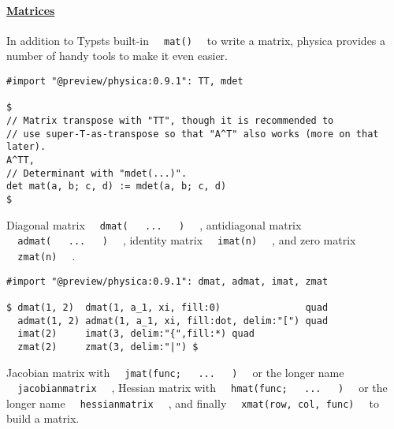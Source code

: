 \pandocbounded{}

\paragraph{\texorpdfstring{\hyperref[matrices]{Matrices}}{Matrices}}\label{matrices}

In addition to Typst\textquotesingle s built-in
\texttt{\ }{\texttt{\ mat()\ }}\texttt{\ } to write a matrix, physica
provides a number of handy tools to make it even easier.

\begin{verbatim}
#import "@preview/physica:0.9.1": TT, mdet

$
// Matrix transpose with "TT", though it is recommended to
// use super-T-as-transpose so that "A^T" also works (more on that later).
A^TT,
// Determinant with "mdet(...)".
det mat(a, b; c, d) := mdet(a, b; c, d)
$
\end{verbatim}

\pandocbounded{}

Diagonal matrix
\texttt{\ }{\texttt{\ dmat(\ }}\texttt{\ }{\texttt{\ ...\ }}\texttt{\ }{\texttt{\ )\ }}\texttt{\ }
, antidiagonal matrix
\texttt{\ }{\texttt{\ admat(\ }}\texttt{\ }{\texttt{\ ...\ }}\texttt{\ }{\texttt{\ )\ }}\texttt{\ }
, identity matrix \texttt{\ }{\texttt{\ imat(n)\ }}\texttt{\ } , and
zero matrix \texttt{\ }{\texttt{\ zmat(n)\ }}\texttt{\ } .

\begin{verbatim}
#import "@preview/physica:0.9.1": dmat, admat, imat, zmat

$ dmat(1, 2)  dmat(1, a_1, xi, fill:0)               quad
  admat(1, 2) admat(1, a_1, xi, fill:dot, delim:"[") quad
  imat(2)     imat(3, delim:"{",fill:*) quad
  zmat(2)     zmat(3, delim:"|") $
\end{verbatim}

\pandocbounded{}

Jacobian matrix with
\texttt{\ }{\texttt{\ jmat(func;\ }}\texttt{\ }{\texttt{\ ...\ }}\texttt{\ }{\texttt{\ )\ }}\texttt{\ }
or the longer name \texttt{\ }{\texttt{\ jacobianmatrix\ }}\texttt{\ } ,
Hessian matrix with
\texttt{\ }{\texttt{\ hmat(func;\ }}\texttt{\ }{\texttt{\ ...\ }}\texttt{\ }{\texttt{\ )\ }}\texttt{\ }
or the longer name \texttt{\ }{\texttt{\ hessianmatrix\ }}\texttt{\ } ,
and finally \texttt{\ }{\texttt{\ xmat(row,\ col,\ func)\ }}\texttt{\ }
to build a matrix.

